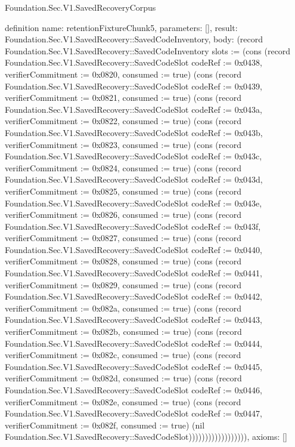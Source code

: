 \begin{lexlean}{Foundation.Sec.V1.SavedRecoveryCorpus}
\begin{semanticmodule}
definition{
  name: retentionFixtureChunk5,
  parameters: [],
  result: Foundation.Sec.V1.SavedRecovery::SavedCodeInventory,
  body: (record Foundation.Sec.V1.SavedRecovery::SavedCodeInventory {slots := (cons (record Foundation.Sec.V1.SavedRecovery::SavedCodeSlot {codeRef := 0x0438, verifierCommitment := 0x0820, consumed := true}) (cons (record Foundation.Sec.V1.SavedRecovery::SavedCodeSlot {codeRef := 0x0439, verifierCommitment := 0x0821, consumed := true}) (cons (record Foundation.Sec.V1.SavedRecovery::SavedCodeSlot {codeRef := 0x043a, verifierCommitment := 0x0822, consumed := true}) (cons (record Foundation.Sec.V1.SavedRecovery::SavedCodeSlot {codeRef := 0x043b, verifierCommitment := 0x0823, consumed := true}) (cons (record Foundation.Sec.V1.SavedRecovery::SavedCodeSlot {codeRef := 0x043c, verifierCommitment := 0x0824, consumed := true}) (cons (record Foundation.Sec.V1.SavedRecovery::SavedCodeSlot {codeRef := 0x043d, verifierCommitment := 0x0825, consumed := true}) (cons (record Foundation.Sec.V1.SavedRecovery::SavedCodeSlot {codeRef := 0x043e, verifierCommitment := 0x0826, consumed := true}) (cons (record Foundation.Sec.V1.SavedRecovery::SavedCodeSlot {codeRef := 0x043f, verifierCommitment := 0x0827, consumed := true}) (cons (record Foundation.Sec.V1.SavedRecovery::SavedCodeSlot {codeRef := 0x0440, verifierCommitment := 0x0828, consumed := true}) (cons (record Foundation.Sec.V1.SavedRecovery::SavedCodeSlot {codeRef := 0x0441, verifierCommitment := 0x0829, consumed := true}) (cons (record Foundation.Sec.V1.SavedRecovery::SavedCodeSlot {codeRef := 0x0442, verifierCommitment := 0x082a, consumed := true}) (cons (record Foundation.Sec.V1.SavedRecovery::SavedCodeSlot {codeRef := 0x0443, verifierCommitment := 0x082b, consumed := true}) (cons (record Foundation.Sec.V1.SavedRecovery::SavedCodeSlot {codeRef := 0x0444, verifierCommitment := 0x082c, consumed := true}) (cons (record Foundation.Sec.V1.SavedRecovery::SavedCodeSlot {codeRef := 0x0445, verifierCommitment := 0x082d, consumed := true}) (cons (record Foundation.Sec.V1.SavedRecovery::SavedCodeSlot {codeRef := 0x0446, verifierCommitment := 0x082e, consumed := true}) (cons (record Foundation.Sec.V1.SavedRecovery::SavedCodeSlot {codeRef := 0x0447, verifierCommitment := 0x082f, consumed := true}) (nil Foundation.Sec.V1.SavedRecovery::SavedCodeSlot)))))))))))))))))}),
  axioms: []
}


\end{semanticmodule}
\end{lexlean}
